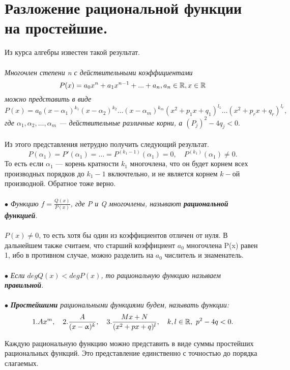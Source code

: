 \section{Разложение рациональной функции на простейшие.}
Из курса алгебры известен такой результат.\\\\
\textit{Многочлен степени n с действительными коэффициентами $$ P(x) = a_0 x^n + a_1 x^{n - 1} + ... + a_n, a_n \in {\mathbb{R}}, x \in {\mathbb{R}} $$ можно представить в виде $$ P(x) = a_0 (x - \alpha_1)^{k_1} (x - \alpha_2)^{k_2} \ldots (x -\alpha_m)^{k_m} (x^2 + p_1x + q_1)^{l_1}\ldots (x^2 + p_rx + q_r)^{l_r},$$ где $ \alpha_1, \alpha_2,\ldots, \alpha_m $ --- действительные различные корни, а $ (P_j)^2 - 4q_j < 0 .$}\\\\
Из этого представления нетрудно получить следующий результат.
$$ P(\alpha_1) = P'(\alpha_1) = \ldots = P^{(k_1 - 1)}(\alpha_1) = 0,\quad P^{(k_1)}(\alpha_1) \neq 0.$$
То есть если $ \alpha_1 $ --- корень кратности $ k_1 $ многочлена, что он будет корнем всех производных порядков до $ k_1 - 1 $ включтельно, и не является корнем $ k-ой $ производной. Обратное тоже верно. \\\\
$\bullet$ \textit{Функцию $ f = \frac{Q(x)}{P(x)} $, где P и Q многочлены, называют \textbf{рациональной функцией}.} \\\\
$ P(x) \neq 0 $, то есть хотя бы один из коэффициентов отличен от нуля. В дальнейшем также считаем, что старший коэффициент $ a_0 $ многочлена P(x) равен 1, ибо в противном случае, можно разделить на $ a_0 $ числитель и знаменатель. \\\\
$\bullet$ \textit{Если $ deg Q(x) < deg P(x) $, то рациональную функцию называем \textbf{правильной}.} \\\\
$\bullet$\textit{ \textbf{Простейшими} рациональными функциями будем, называть функции:}
$$1. A x^m, \quad 2. \frac{A}{(x - \upalpha)^k}, \quad 3. \frac{Mx + N}{(x^2 + px + q)^l},\quad k,l \in {\mathbb{R}},\ p^2 - 4q < 0. $$
\begin{theorem}
	Каждую рациональную функцию можно представить в виде суммы простейших рациональных функций. Это представление единственно с точностью до порядка слагаемых.
\end{theorem}
